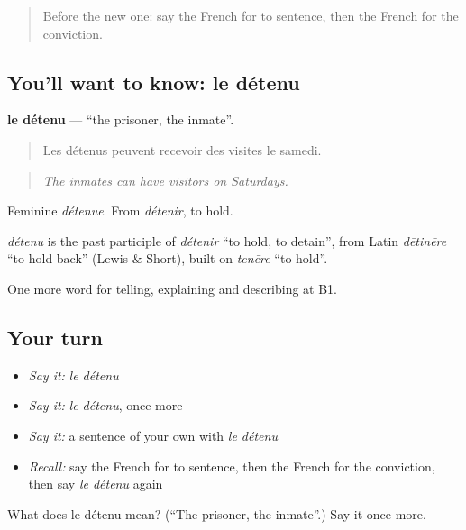 \begin{quote}
Before the new one: say the French for to sentence, then the French for the conviction.
\end{quote}

\subsection*{You'll want to know: le détenu}
\textbf{le détenu} — \textquotedblleft{}the prisoner, the inmate\textquotedblright{}.

\begin{quote}
Les détenus peuvent recevoir des visites le samedi.
\end{quote}

\begin{quote}
\emph{The inmates can have visitors on Saturdays.}
\end{quote}

Feminine \emph{détenue}. From \emph{détenir}, to hold.

\begin{cousinweb}
\emph{détenu} is the past participle of \emph{détenir} \textquotedblleft{}to hold, to detain\textquotedblright{}, from Latin \emph{dētinēre} \textquotedblleft{}to hold back\textquotedblright{} (Lewis \& Short), built on \emph{tenēre} \textquotedblleft{}to hold\textquotedblright{}.
\end{cousinweb}

\begin{grammarlens}[title={What you've built}]
One more word for telling, explaining and describing at B1.
\end{grammarlens}

\subsection*{Your turn}
\begin{itemize}
\raggedright
  \item \emph{Say it:} \emph{le détenu}
  \item \emph{Say it:} \emph{le détenu}, once more
  \item \emph{Say it:} a sentence of your own with \emph{le détenu}
  \item \emph{Recall:} say the French for to sentence, then the French for the conviction, then say \emph{le détenu} again
\end{itemize}

\begin{tcolorbox}[breakable,colback=teal!4,colframe=teal!35!black,title={Before you move on}]
What does le détenu mean? (\textquotedblleft{}The prisoner, the inmate\textquotedblright{}.) Say it once more.
\end{tcolorbox}
